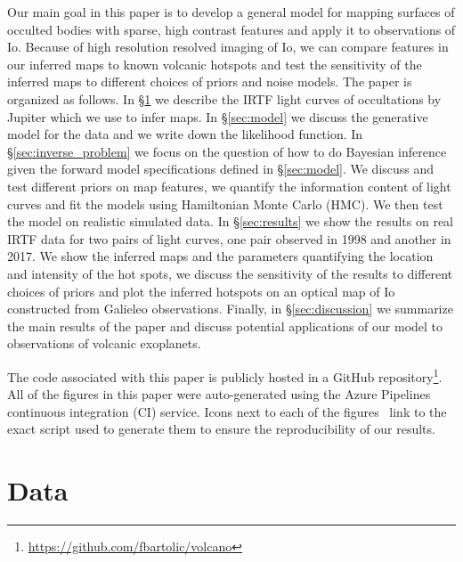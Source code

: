 \documentclass[modern]{aastex62}
\begin{document}
Our main goal in this paper is to develop a general model for mapping surfaces of occulted bodies with sparse, high contrast features and apply it to observations of Io.
Because of high resolution resolved imaging of Io, we can compare features in our inferred maps to known volcanic hotspots and test the sensitivity of the inferred maps to different choices of priors and noise models.
The paper is organized as follows.
In \S\ref{sec:data} we describe the IRTF light curves of occultations by Jupiter which we use to infer maps.
In \S\ref{sec:model} we discuss the generative model for the data and we write down the likelihood function.
In \S\ref{sec:inverse_problem} we focus on the question of how to do Bayesian inference given the forward model specifications defined in \S\ref{sec:model}.
We discuss and test different priors on map features, we quantify the information content of light curves and fit the models using Hamiltonian Monte Carlo (HMC). 
We then test the model on realistic simulated data.
In \S\ref{sec:results} we show the results on real IRTF data for two pairs of light curves, one pair observed in 1998 and another in 2017.
We show the inferred maps and the parameters quantifying the location and intensity of the hot spots, we discuss the sensitivity of the results to different choices of priors and plot the inferred hotspots on an optical map of Io constructed from Galieleo observations.
Finally, in \S\ref{sec:discussion} we summarize the main results of the paper and discuss potential applications of our model to observations of volcanic exoplanets.

\vspace{1em}

The code associated with this paper is publicly hosted in a GitHub repository\footnote{\url{https://github.com/fbartolic/volcano}}. 
All of the figures in this paper were auto-generated
using the Azure Pipelines continuous integration (CI) service.
Icons next to each of the figures \codeicon \,
link to the exact script used to generate them to ensure the reproducibility
of our results. 

\section{Data}
\label{sec:data}
\end{document}
